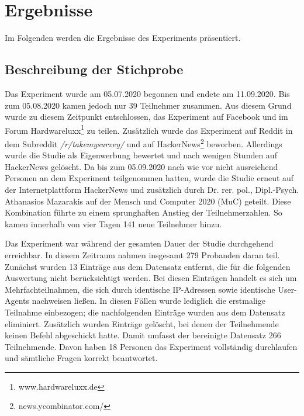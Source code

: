 \section{Ergebnisse}
Im Folgenden werden die Ergebnisse des Experiments präsentiert.

\subsection{Beschreibung der Stichprobe}\label{beschreibung}
Das Experiment wurde am 05.07.2020 begonnen und endete am 11.09.2020. Bis zum 05.08.2020 kamen jedoch nur 39 Teilnehmer zusammen. Aus diesem Grund wurde zu diesem Zeitpunkt entschlossen, das Experiment auf Facebook und im Forum Hardwareluxx\footnote{www.hardwareluxx.de} zu teilen. Zusätzlich wurde das Experiment auf Reddit in dem Subreddit \textit{/r/takemysurvey/} und auf HackerNews\footnote{news.ycombinator.com/} beworben. Allerdings wurde die Studie als Eigenwerbung bewertet und nach wenigen Stunden auf HackerNews gelöscht. Da bis zum 05.09.2020 nach wie vor nicht ausreichend Personen an dem Experiment teilgenommen hatten, wurde die Studie erneut auf der Internetplattform HackerNews und zusätzlich durch Dr. rer. pol., Dipl.-Psych. Athanasios Mazarakis auf der Mensch und Computer 2020 (MuC) geteilt. Diese Kombination führte zu einem sprunghaften Anstieg der Teilnehmerzahlen. So kamen innerhalb von vier Tagen 141 neue Teilnehmer hinzu.

Das Experiment war während der gesamten Dauer der Studie durchgehend erreichbar. In diesem Zeitraum nahmen insgesamt 279 Probanden daran teil. Zunächst wurden 13 Einträge aus dem Datensatz entfernt, die für die folgenden Auswertung nicht berücksichtigt werden. Bei diesen Einträgen handelt es sich um Mehrfachteilnahmen, die sich durch identische IP-Adressen sowie identische User-Agents nachweisen ließen. In diesen Fällen wurde lediglich die erstmalige Teilnahme einbezogen; die nachfolgenden Einträge wurden aus dem Datensatz eliminiert. Zusätzlich wurden Einträge gelöscht, bei denen der Teilnehmende keinen Befehl abgeschickt hatte. Damit umfasst der bereinigte Datensatz 266 Teilnehmende. Davon haben 18 Personen das Experiment vollständig durchlaufen und sämtliche Fragen korrekt beantwortet.

